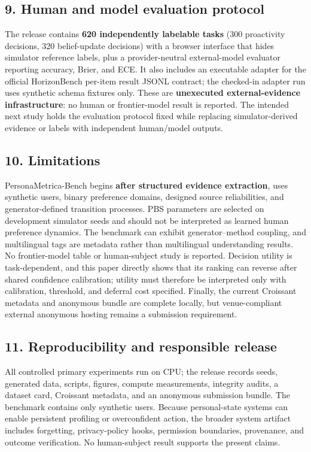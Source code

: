 \subsection{9. Human and model evaluation
protocol}\label{human-and-model-evaluation-protocol}

The release contains \textbf{620 independently labelable tasks} (300
proactivity decisions, 320 belief-update decisions) with a browser
interface that hides simulator reference labels, plus a provider-neutral
external-model evaluator reporting accuracy, Brier, and ECE. It also
includes an executable adapter for the official HorizonBench per-item
result JSONL contract; the checked-in adapter run uses synthetic schema
fixtures only. These are \textbf{unexecuted external-evidence
infrastructure}: no human or frontier-model result is reported. The
intended next study holds the evaluation protocol fixed while replacing
simulator-derived evidence or labels with independent human/model
outputs.

\subsection{10. Limitations}\label{limitations}

PersonaMetrica-Bench begins \textbf{after structured evidence
extraction}, uses synthetic users, binary preference domains, designed
source reliabilities, and generator-defined transition processes. PBS
parameters are selected on development simulator seeds and should not be
interpreted as learned human preference dynamics. The benchmark can
exhibit generator--method coupling, and multilingual tags are metadata
rather than multilingual understanding results. No frontier-model table
or human-subject study is reported. Decision utility is task-dependent,
and this paper directly shows that its ranking can reverse after shared
confidence calibration; utility must therefore be interpreted only with
calibration, threshold, and deferral cost specified. Finally, the
current Croissant metadata and anonymous bundle are complete locally,
but venue-compliant external anonymous hosting remains a submission
requirement.

\subsection{11. Reproducibility and responsible
release}\label{reproducibility-and-responsible-release}

All controlled primary experiments run on CPU; the release records
seeds, generated data, scripts, figures, compute measurements, integrity
audits, a dataset card, Croissant metadata, and an anonymous submission
bundle. The benchmark contains only synthetic users. Because
personal-state systems can enable persistent profiling or overconfident
action, the broader system artifact includes forgetting, privacy-policy
hooks, permission boundaries, provenance, and outcome verification. No
human-subject result supports the present claims.

